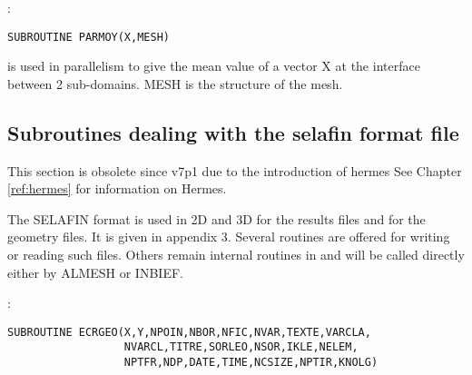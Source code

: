 :
\begin{lstlisting}[language=TelFortran]
SUBROUTINE PARMOY(X,MESH)
\end{lstlisting}

 is used in parallelism to give the mean value of a vector X at
the interface between 2 sub-domains. MESH is the  structure
of the mesh.

\subsection{Subroutines dealing with the selafin format file}
\begin{WarningBlock}
  This section is obsolete since v7p1 due to the introduction of hermes See
  Chapter \ref{ref:hermes} for information on Hermes.
\end{WarningBlock}
The SELAFIN format is used in 2D and 3D for the results files and for the
geometry files. It is given in appendix 3. Several routines are offered for
writing or reading such files. Others remain internal routines in \bief and will
be called directly either by ALMESH or INBIEF.

:
\begin{lstlisting}[language=TelFortran]
SUBROUTINE ECRGEO(X,Y,NPOIN,NBOR,NFIC,NVAR,TEXTE,VARCLA,
                  NVARCL,TITRE,SORLEO,NSOR,IKLE,NELEM,
                  NPTFR,NDP,DATE,TIME,NCSIZE,NPTIR,KNOLG)
\end{lstlisting}

